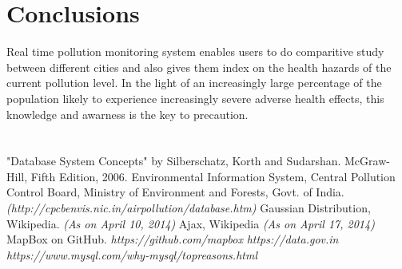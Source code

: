\documentclass[twocolumn]{article}
\begin{document}
\section{Conclusions}
Real time pollution monitoring system enables users to do comparitive study between different cities and also gives them index on the health hazards of the current pollution level. In the light of an increasingly large percentage of the population likely to experience increasingly severe adverse health effects, this knowledge and awarness is the key to precaution.

\section*{}
\begin{thebibliography}{2}
 "Database System Concepts" by Silberschatz, Korth and Sudarshan. McGraw-Hill, Fifth Edition, 2006.
 Environmental Information System, Central Pollution Control Board, Ministry of Environment and Forests, Govt. of India. \textit{(http://cpcbenvis.nic.in/airpollution/database.htm)}
 Gaussian Distribution, Wikipedia. \textit{(As on April 10, 2014)}
 Ajax, Wikipedia \textit{(As on April 17, 2014)}
 MapBox on GitHub. \textit{https://github.com/mapbox}
 \textit{https://data.gov.in}
 \textit{https://www.mysql.com/why-mysql/topreasons.html} 
\end{thebibliography}
\end{document}
